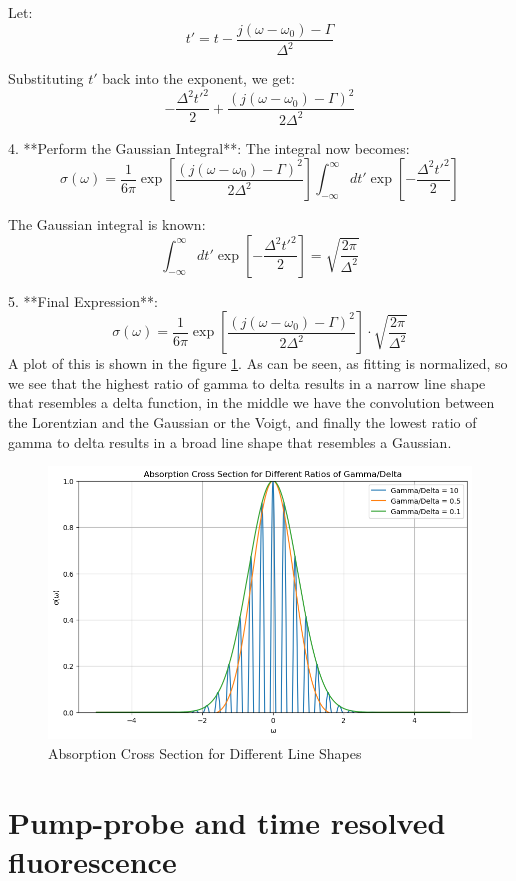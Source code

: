 \documentclass[12pt]{article}
\begin{document}
   Let:
   \[
   t' = t - \frac{j(\omega - \omega_0) - \Gamma}{\Delta^2}
   \]

   Substituting \( t' \) back into the exponent, we get:
   \[
   -\frac{\Delta^2 t'^2}{2} + \frac{(j(\omega - \omega_0) - \Gamma)^2}{2 \Delta^2}
   \]

4. **Perform the Gaussian Integral**:
   The integral now becomes:
   \[
   \sigma(\omega) = \frac{1}{6\pi} \exp \left[\frac{(j(\omega - \omega_0) - \Gamma)^2}{2\Delta^2}\right] \int_{-\infty}^{\infty} dt' \exp \left[-\frac{\Delta^2 t'^2}{2}\right]
   \]

   The Gaussian integral is known:
   \[
   \int_{-\infty}^{\infty} dt' \exp \left[-\frac{\Delta^2 t'^2}{2}\right] = \sqrt{\frac{2\pi}{\Delta^2}}
   \]

5. **Final Expression**:
   \[
   \sigma(\omega) = \frac{1}{6\pi} \exp \left[\frac{(j(\omega - \omega_0) - \Gamma)^2}{2\Delta^2}\right] \cdot \sqrt{\frac{2\pi}{\Delta^2}}
   \]
A plot of this is shown in the figure \ref{fig:acs}. As can be seen, as fitting is normalized, so we see that the highest ratio of gamma to delta results in a narrow line shape that resembles a delta function, in the middle we have the convolution between the Lorentzian and the Gaussian or the Voigt, and finally the lowest ratio of gamma to delta results in a broad line shape that resembles a Gaussian.
\begin{figure}
  \centering
  \includegraphics[max width=\textwidth]{acs.png}
  \caption{Absorption Cross Section for Different Line Shapes}
  \label{fig:acs}
\end{figure}
\section{Pump-probe and time resolved fluorescence}
\end{document}
